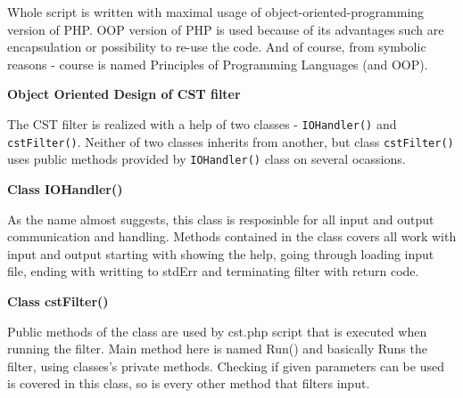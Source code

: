 \documentclass[10pt, a4paper]{report}
\begin{document}

\vspace{0.5cm}
	\par \fontsize{10pt}{1.3}\selectfont Whole script is written with maximal usage of object-oriented-programming version of PHP. OOP version of PHP is used because of its advantages such are encapsulation or possibility to re-use the code. And of course, from symbolic reasons - course is named Principles of Programming Languages (and OOP).

\vspace{0.5cm}
\par\noindent\fontsize{12pt}{1.3}\selectfont\textbf{Object Oriented Design of CST filter}
	
	\vspace{0.15cm}
	\par \fontsize{10pt}{1.3}\selectfont The CST filter is realized with a help of two classes - \verb|IOHandler()| and \verb|cstFilter()|. Neither of two classes inherits from another, but class \verb|cstFilter()| uses public methods provided by \verb|IOHandler()| class on several ocassions. 

	\vspace{0.35cm}
	\par\noindent\fontsize{11pt}{1.3}\selectfont\textbf{Class IOHandler()}
	\vspace{0.15cm}
	\par \fontsize{10pt}{1.3}\selectfont As the name almost suggests, this class is resposinble for all input and output communication and handling. Methods contained in the class covers all work with input and output starting with showing the help, going through loading input file, ending with writting to stdErr and terminating filter with return code.

	\vspace{0.35cm}
	\par\noindent\fontsize{11pt}{1.3}\selectfont\textbf{Class cstFilter()}
	\vspace{0.15cm}
	\par \fontsize{10pt}{1.3}\selectfont Public methods of the class are used by cst.php script that is executed when running the filter. Main method here is named Run() and basically Runs the filter, using classes's private methods. Checking if given parameters can be used is covered in this class, so is every other method that filters input.
\end{document}

